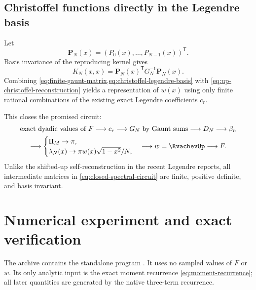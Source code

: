 \documentclass[11pt,oneside]{article}
\theoremstyle{definition}
\theoremstyle{remark}
\numberwithin{equation}{section}
\begin{document}
\subsection{Christoffel functions directly in the Legendre basis}
Let
\begin{equation}
 \mathbf P_N(x)=(P_0(x),\ldots,P_{N-1}(x))^{\mathsf T}.
 \label{eq:legendre-vector}
\end{equation}
Basis invariance of the reproducing kernel gives
\begin{equation}
 \boxed{
 K_N(x,x)=\mathbf P_N(x)^{\mathsf T}G_N^{-1}\mathbf P_N(x).}
 \label{eq:christoffel-legendre-basis}
\end{equation}
Combining \cref{eq:finite-gaunt-matrix,eq:christoffel-legendre-basis} with
\cref{eq:up-christoffel-reconstruction} yields a representation of $w(x)$
using only finite rational combinations of the existing exact Legendre
coefficients $c_r$.

This closes the promised circuit:
\begin{equation}
 \begin{gathered}
 \text{exact dyadic values of }F
 \longrightarrow c_r
 \longrightarrow G_N\text{ by Gaunt sums}
 \longrightarrow D_N
 \longrightarrow \beta_n\\
 \longrightarrow
 \begin{cases}
 \Pi_M\to\pi,\\
 \lambda_N(x)\to\pi w(x)\sqrt{1-x^2}/N,
 \end{cases}
 \longrightarrow w=\RvachevUp\longrightarrow F.
 \end{gathered}
 \label{eq:closed-spectral-circuit}
\end{equation}
Unlike the shifted-up self-reconstruction in the recent Legendre reports,
all intermediate matrices in \cref{eq:closed-spectral-circuit} are finite,
positive definite, and basis invariant.

\section{Numerical experiment and exact verification}
\label{sec:numerics}

The archive contains the standalone program
.  It uses no sampled values of $F$ or
$w$.  Its only analytic input is the exact moment recurrence
\cref{eq:moment-recurrence}; all later quantities are generated by the native
three-term recurrence.
\end{document}
